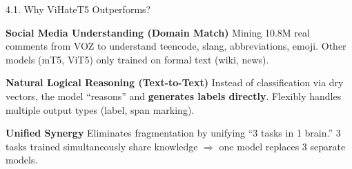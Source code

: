 \documentclass[11pt, aspectratio=169]{beamer}
\begin{document}
\begin{frame}{4.1. Why ViHateT5 Outperforms?}
\scriptsize

\begin{block}{\textbf{Social Media Understanding (Domain Match)}}
  Mining 10.8M real comments from VOZ to understand teencode, slang, abbreviations, emoji. Other models (mT5, ViT5) only trained on formal text (wiki, news).
\end{block}

\begin{block}{\textbf{Natural Logical Reasoning (Text-to-Text)}}
  Instead of classification via dry vectors, the model ``reasons'' and \textbf{generates labels directly}. Flexibly handles multiple output types (label, span marking).
\end{block}

\begin{block}{\textbf{Unified Synergy}}
  Eliminates fragmentation by unifying ``3 tasks in 1 brain.'' 3 tasks trained simultaneously share knowledge $\Rightarrow$ one model replaces 3 separate models.
\end{block}
\end{frame}
\end{document}

